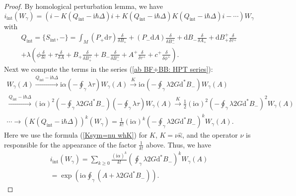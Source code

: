 \documentclass[10pt,a4paper]{amsart}
\newcommand{\dr}{\mathrm{d}}
\newcommand{\ii}{\mathrm{int}}
\newcommand{\iii}{\mathrm{i}}
\newcommand{\ra}{\rightarrow}
\newcommand{\wh}{\widehat}
\newcommand{\xra}{\xrightarrow}
\begin{document}
\begin{proof}
By homological perturbation lemma, we have
\begin{equation}\label{ab BF+BB: HPT series}
    i_\ii(W_\gamma)=(i-K(Q_\ii-\iii\hbar \Delta) i + K(Q_\ii-\iii\hbar \Delta)K(Q_\ii-\iii\hbar \Delta) i-\cdots) W_\gamma
\end{equation}
with 
\begin{multline}
    Q_\ii=\{S_\ii,-\}= \int_M (P_+ \dr\tau) \frac{\delta}{\delta B_+}+ (P_- \dr A) \frac{\delta}{\delta B_-^+}+\dr B_- \frac{\delta}{\delta A_+} + \dr B_+^+ \frac{\delta}{\delta \tau^+}\\
    +\lambda \left(
    \phi\frac{\delta}{\delta c}+\tau \frac{\delta}{\delta A}+B_+\frac{\delta}{\delta B_+^+}+B_-\frac{\delta}{\delta B_-^+}+A^+\frac{\delta}{\delta \tau^+}+c^+\frac{\delta}{\delta \phi^+}
    \right).
\end{multline}
Next we compute the terms in the series (\ref{ab BF+BB: HPT series}):
\begin{multline}
    W_\gamma(A) \xra{Q_\ii-\iii\hbar\Delta} \iii\alpha\left(-\oint_\gamma \lambda \tau\right)W_\gamma(A) \xra{K} \iii\alpha\left(-\oint_\gamma \lambda 2G\dr^* B_-\right)W_\gamma(A) \\
    \xra{Q_\ii-\iii\hbar\Delta} (\iii\alpha)^2\left(-\oint_\gamma \lambda 2G\dr^* B_-\right)\left(-\oint_\gamma \lambda \tau\right)W_\gamma(A) 
    \xra{K} 
    \frac12  (\iii\alpha)^2\left(-\oint_\gamma \lambda 2G\dr^* B_-\right)^2 W_\gamma(A)\\
    \cdots \ra (K(Q_\ii-\iii\hbar\Delta))^k (W_\gamma)=
    \frac{1}{k!}(\iii\alpha)^k \left(-\oint_\gamma \lambda 2G\dr^* B_-\right)^k W_\gamma(A).
\end{multline}
Here we use the formula (\ref{Ksym=nu whK}) for $K$, $K=\nu\wh\kappa$, and the operator $\nu$ is responsible for the appearance of the factor $\frac{1}{k!}$ above. Thus, we have
\begin{multline}
    i_\ii(W_\gamma)= \sum_{k\geq 0}\frac{(\iii\alpha)^k}{k!} \left(\oint_\gamma \lambda 2G\dr^* B_-\right)^k W_\gamma(A)\\
    =\exp \left(\iii\alpha \oint_\gamma (A+\lambda 2 G \dr^*B_-)\right).
\end{multline}
\end{proof}
\end{document}
